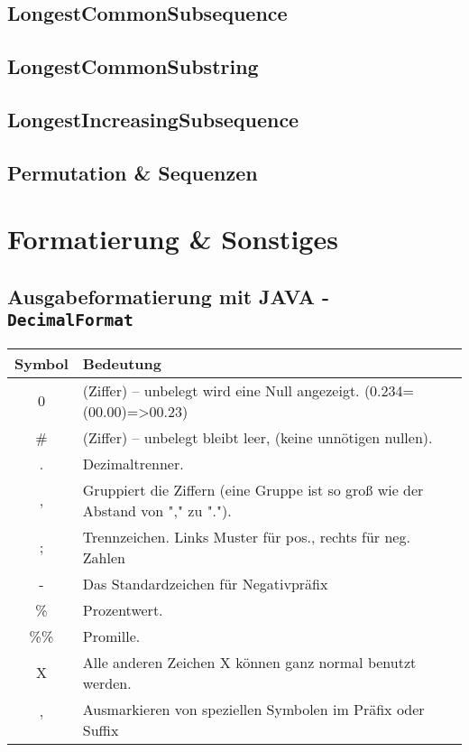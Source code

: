 \documentclass[10pt,a4paper,ngerman,oneside,
]{article}
\begin{document}
\subsection{LongestCommonSubsequence}

\subsection{LongestCommonSubstring}

\subsection{LongestIncreasingSubsequence}

\subsection{Permutation \& Sequenzen}

\section{Formatierung \& Sonstiges}
\subsection{Ausgabeformatierung mit JAVA - \texttt{DecimalFormat}}
\begin{tabular}{cl}
Symbol & Bedeutung\\\hline
0 &	(Ziffer) – unbelegt wird eine Null angezeigt. (0.234=(00.00)=>00.23)\\
\# &	(Ziffer) – unbelegt bleibt leer, (keine unnötigen nullen).\\
. &	Dezimaltrenner. \\
, &	Gruppiert die Ziffern (eine Gruppe ist so groß wie der Abstand von "," zu ".").\\
; &	Trennzeichen. Links Muster für pos., rechts für neg. Zahlen\\
- &	Das Standardzeichen für Negativpräfix\\
\% &	Prozentwert.\\
\%\% &	Promille.\\
X &	Alle anderen Zeichen X können ganz normal benutzt werden.\\
' &	Ausmarkieren von speziellen Symbolen im Präfix oder Suffix \\
\end{tabular}
\end{document}
